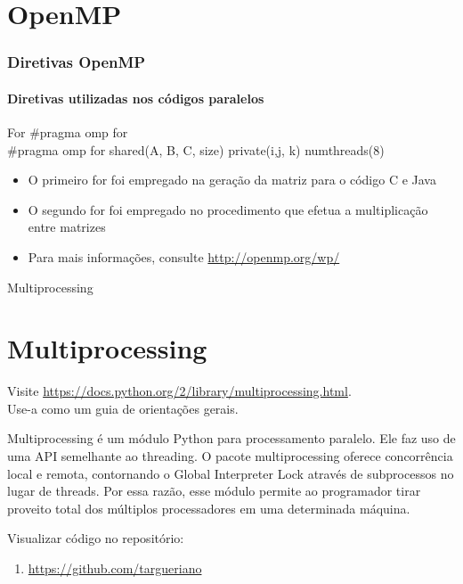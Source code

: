 \documentclass[aspectratio=169]{beamer}
\begin{document}
\section{OpenMP}
\begin{frame}
\frametitle{Diretivas OpenMP}
\framesubtitle{Diretivas utilizadas nos códigos paralelos}

\begin{block}{For}
  \#pragma omp for\\
  \#pragma omp for shared(A, B, C, size) private(i,j, k) num\underline{\hspace{.10in}}threads(8)
\end{block}

\begin{itemize}
 \item O primeiro for foi empregado na geração da matriz para o código C e Java\pause
 
 \item O segundo for foi empregado no procedimento que efetua a multiplicação entre matrizes \pause
 
 \item Para mais informações, consulte 
 \url{http://openmp.org/wp/}
 
\end{itemize}

\end{frame}

\begin{frame}{Multiprocessing}
\section{Multiprocessing}
Visite \url{https://docs.python.org/2/library/multiprocessing.html}.\\ 
Use-a como um guia de orientações gerais.
\vspace{0.7cm}

Multiprocessing é um módulo Python para processamento paralelo. Ele faz uso de uma API semelhante ao threading. 
O pacote multiprocessing oferece concorrência local e remota, contornando o Global Interpreter Lock através de subprocessos no lugar de threads. Por essa razão, esse módulo permite ao programador tirar proveito total dos múltiplos processadores em uma determinada máquina.

Visualizar código no repositório:
\begin{enumerate}
 \item \url{https://github.com/targueriano}
\end{enumerate}

\end{frame}
\end{document}
